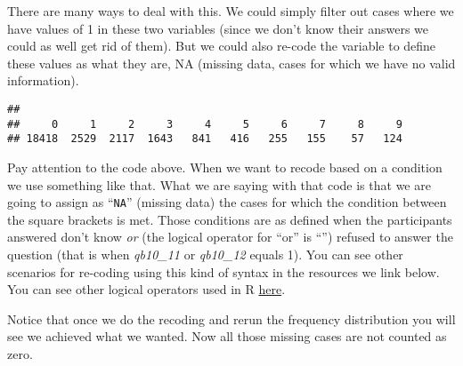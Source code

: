 \documentclass[
]{book}
\newenvironment{Shaded}{\begin{snugshade}}{\end{snugshade}}
\newcommand{\ConstantTok}[1]{\textcolor[rgb]{0.56,0.35,0.01}{#1}}
\newcommand{\DecValTok}[1]{\textcolor[rgb]{0.00,0.00,0.81}{#1}}
\newcommand{\FunctionTok}[1]{\textcolor[rgb]{0.13,0.29,0.53}{\textbf{#1}}}
\newcommand{\NormalTok}[1]{#1}
\newcommand{\OtherTok}[1]{\textcolor[rgb]{0.56,0.35,0.01}{#1}}
\newcommand{\SpecialCharTok}[1]{\textcolor[rgb]{0.81,0.36,0.00}{\textbf{#1}}}
\begin{document}
There are many ways to deal with this. We could simply filter out cases where we have values of 1 in these two variables (since we don't know their answers we could as well get rid of them). But we could also re-code the variable to define these values as what they are, NA (missing data, cases for which we have no valid information).

\begin{Shaded}
\end{Shaded}

\begin{verbatim}
## 
##     0     1     2     3     4     5     6     7     8     9 
## 18418  2529  2117  1643   841   416   255   155    57   124
\end{verbatim}

Pay attention to the code above. When we want to recode based on a condition we use something like that. What we are saying with that code is that we are going to assign as ``\texttt{NA}'' (missing data) the cases for which the condition between the square brackets is met. Those conditions are as defined when the participants answered don't know \emph{or} (the logical operator for ``or'' is ``\textbar{}'') refused to answer the question (that is when \emph{qb10\_11} or \emph{qb10\_12} equals 1). You can see other scenarios for re-coding using this kind of syntax in the resources we link below. You can see other logical operators used in R \href{https://www.datamentor.io/r-programming/operator/}{here}.

Notice that once we do the recoding and rerun the frequency distribution you will see we achieved what we wanted. Now all those missing cases are not counted as zero.
\end{document}
